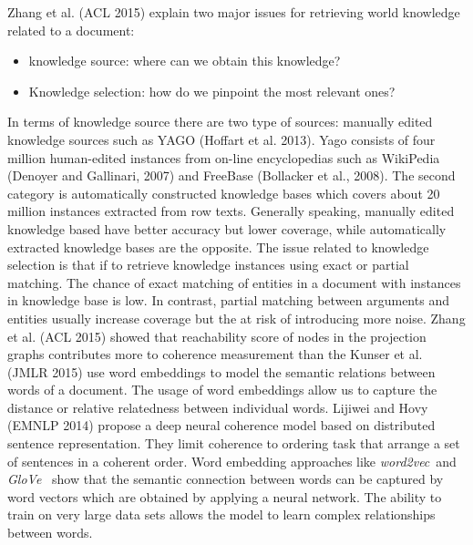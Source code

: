 Zhang et al. (ACL 2015) explain two major issues for retrieving world knowledge related to a document: 
\begin{itemize}
\item knowledge source: where can we obtain this knowledge? 
\item Knowledge selection: how do we pinpoint the most relevant ones?
\end{itemize}

In terms of knowledge source there are two type of sources: manually edited knowledge sources such as YAGO (Hoffart et al. 2013).
Yago consists of four million human-edited instances from on-line encyclopedias such as WikiPedia (Denoyer and Gallinari, 2007) and FreeBase (Bollacker et al., 2008).
The second category is automatically constructed knowledge bases which covers about 20 million instances extracted from row texts. 
Generally speaking, manually edited knowledge based have better accuracy but lower coverage, while automatically extracted knowledge bases are the opposite. 
The issue related to knowledge selection is that if to retrieve knowledge instances using exact or partial matching. 
The chance of exact matching of entities in a document with instances in knowledge base is low. 
In contrast, partial matching between arguments and entities usually increase coverage but the at risk of introducing more noise. 
Zhang et al. (ACL 2015) showed that reachability score of nodes in the projection graphs contributes more to coherence measurement than the 
Kunser et al. (JMLR 2015) use word embeddings to model the semantic relations between words of a document. 
The usage of word embeddings allow us to capture the distance or relative relatedness between individual words. 
Lijiwei and Hovy (EMNLP 2014) propose a deep neural coherence model based on distributed sentence representation. 
They limit coherence to ordering task that arrange a set of sentences in a coherent order. 
Word embedding approaches like \emph{word2vec}\ and \emph{GloVe}\ \cite{mikolov13c,pennington14} show that the semantic connection
between words can be captured by word vectors which are obtained by applying a neural network. 
The ability to train on very large data sets allows the model to learn complex relationships between words.


